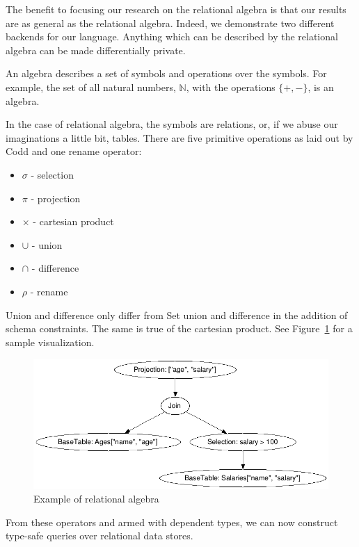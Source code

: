 \documentclass[12pt]{article}
\begin{document}
The benefit to focusing our research on the relational algebra is that our results are as general as the relational algebra.
Indeed, we demonstrate two different backends for our language.
Anything which can be described by the relational algebra can be made differentially private. %

An algebra describes a set of symbols and operations over the symbols.
For example, the set of all natural numbers, $\mathbb{N}$, with the operations $\{+,-\}$, is an algebra.

In the case of relational algebra, the symbols are relations, or, if we abuse our imaginations a little bit, tables.
There are five primitive operations as laid out by Codd\cite{codd70} and one rename operator:

\begin{itemize}
  \item $\sigma$ - selection
  \item $\pi$    - projection
  \item $\times$ - cartesian product
  \item $\cup$   - union
  \item $\cap$   - difference
  \item $\rho$   - rename
\end{itemize}

Union and difference only differ from Set union and difference in the addition of schema constraints.
The same is true of the cartesian product.
See Figure~\ref{fig:example_relalg} for a sample visualization.

\begin{figure}[tb]
  \centering
  \includegraphics[width=\textwidth]{assets/relalg.jpg}
  \caption{Example of relational algebra}
  \label{fig:example_relalg}
\end{figure}

From these operators and armed with dependent types, we can now construct type-safe queries over relational data stores.
\end{document}
